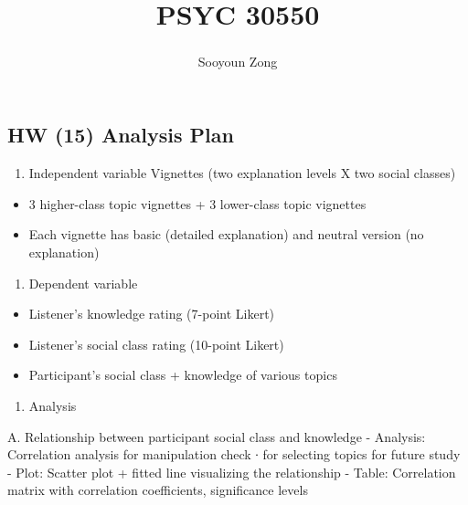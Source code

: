\documentclass[
  man]{apa6}
\title{PSYC 30550}
\author{Sooyoun Zong\textsuperscript{}}
\date{}
\affiliation{\phantom{0}}
\providecommand{\tightlist}{%
  \setlength{\itemsep}{0pt}\setlength{\parskip}{0pt}}
\begin{document}
\maketitle

\hypertarget{hw-15-analysis-plan}{%
\subsection{HW (15) Analysis Plan}\label{hw-15-analysis-plan}}

\begin{enumerate}
\def\labelenumi{\arabic{enumi}.}
\tightlist
\item
  Independent variable Vignettes (two explanation levels X two social classes)
\end{enumerate}

\begin{itemize}
\tightlist
\item
  3 higher-class topic vignettes + 3 lower-class topic vignettes
\item
  Each vignette has basic (detailed explanation) and neutral version (no explanation)
\end{itemize}

\begin{enumerate}
\def\labelenumi{\arabic{enumi}.}
\setcounter{enumi}{1}
\tightlist
\item
  Dependent variable
\end{enumerate}

\begin{itemize}
\tightlist
\item
  Listener's knowledge rating (7-point Likert)
\item
  Listener's social class rating (10-point Likert)
\item
  Participant's social class + knowledge of various topics
\end{itemize}

\begin{enumerate}
\def\labelenumi{\arabic{enumi}.}
\setcounter{enumi}{2}
\tightlist
\item
  Analysis
\end{enumerate}

A. Relationship between participant social class and knowledge
- Analysis: Correlation analysis for manipulation check ∙ for selecting topics for future study
- Plot: Scatter plot + fitted line visualizing the relationship
- Table: Correlation matrix with correlation coefficients, significance levels
\end{document}
